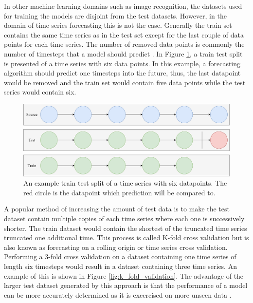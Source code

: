 In other machine learning domains such as image recognition, the datasets used for training the models are disjoint from the test datasets. However, in the domain of time series forecasting this is not the case. Generally the train set contains the same time series as in the test set except for the last couple of data points for each time series. The number of removed data points is commonly the number of timesteps that a model should predict \cite{hyndman_forecasting_3rd,gluonts-github}. In Figure \ref{fig:train_test_split}, a train test split is presented of a time series with six data points. In this example, a forecasting algorithm should predict one timesteps into the future, thus, the last datapoint would be removed and the train set would contain five data points while the test series would contain six.

\begin{figure}[htb]
  \centering
  \includegraphics[width=\linewidth]{./img/train_test_split.png}
  \caption{An example train test split of a time series with six datapoints. The red circle is the datapoint which prediction will be compared to.}
  \label{fig:train_test_split}
  \endminipage\hfill
\end{figure}


A popular method of increasing the amount of test data is to make the test dataset contain multiple copies of each time series where each one is successively shorter. The train dataset would contain the shortest of the truncated time series truncated one additional time. This process is called K-fold cross validation but is also known as forecasting on a rolling origin or time series cross validation. Performing a 3-fold cross validation on a dataset containing one time series of length six timesteps would result in a dataset containing three time series. An example of this is shown in Figure \ref{fig:k_fold_validation}. The advantage of the larger test dataset generated by this approach is that the performance of a model can be more accurately determined as it is excercised on more unseen data \cite{hyndman_forecasting_3rd}.

